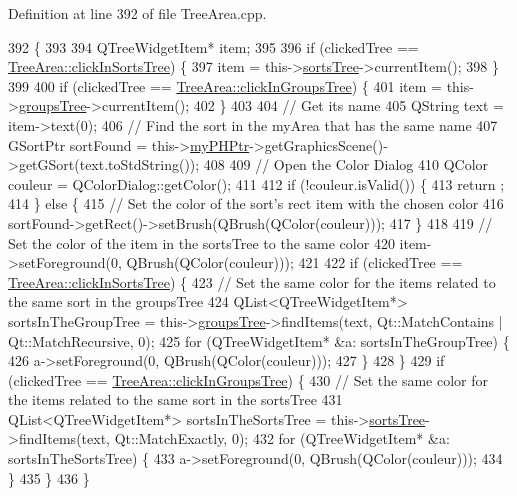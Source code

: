 Definition at line 392 of file Tree\+Area.\+cpp.


\begin{DoxyCode}
392                                               \{
393 
394     QTreeWidgetItem* item;
395 
396     \textcolor{keywordflow}{if} (clickedTree == \hyperlink{classTreeArea_a580e62f552dbda007c636bc69cc5e0a7}{TreeArea::clickInSortsTree}) \{
397         item = this->\hyperlink{classTreeArea_ad323879d9e2e64b18dae18fe757b1b0e}{sortsTree}->currentItem();
398     \}
399 
400     \textcolor{keywordflow}{if} (clickedTree == \hyperlink{classTreeArea_a6c8a68ece69178b1c902cf8ee8652756}{TreeArea::clickInGroupsTree}) \{
401         item = this->\hyperlink{classTreeArea_ab3cf8ca35655b0bace24a7c46170852f}{groupsTree}->currentItem();
402     \}
403 
404     \textcolor{comment}{// Get its name}
405     QString text = item->text(0);
406     \textcolor{comment}{// Find the sort in the myArea that has the same name}
407     GSortPtr sortFound = this->\hyperlink{classTreeArea_a290d659da16085f21c04f81fcd16891c}{myPHPtr}->getGraphicsScene()->getGSort(text.toStdString());
408 
409     \textcolor{comment}{// Open the Color Dialog}
410     QColor couleur = QColorDialog::getColor();
411 
412     \textcolor{keywordflow}{if} (!couleur.isValid()) \{
413         return ;
414     \} \textcolor{keywordflow}{else} \{
415         \textcolor{comment}{// Set the color of the sort's rect item with the chosen color}
416         sortFound->getRect()->setBrush(QBrush(QColor(couleur)));
417     \}
418 
419     \textcolor{comment}{// Set the color of the item in the sortsTree to the same color}
420     item->setForeground(0, QBrush(QColor(couleur)));
421 
422     \textcolor{keywordflow}{if} (clickedTree == \hyperlink{classTreeArea_a580e62f552dbda007c636bc69cc5e0a7}{TreeArea::clickInSortsTree}) \{
423         \textcolor{comment}{// Set the same color for the items related to the same sort in the groupsTree}
424         QList<QTreeWidgetItem*> sortsInTheGroupTree = this->\hyperlink{classTreeArea_ab3cf8ca35655b0bace24a7c46170852f}{groupsTree}->findItems(text, 
      Qt::MatchContains | Qt::MatchRecursive, 0);
425         \textcolor{keywordflow}{for} (QTreeWidgetItem* &a: sortsInTheGroupTree) \{
426             a->setForeground(0, QBrush(QColor(couleur)));
427         \}
428     \}
429     \textcolor{keywordflow}{if} (clickedTree == \hyperlink{classTreeArea_a6c8a68ece69178b1c902cf8ee8652756}{TreeArea::clickInGroupsTree}) \{
430         \textcolor{comment}{// Set the same color for the items related to the same sort in the sortsTree}
431         QList<QTreeWidgetItem*> sortsInTheSortsTree = this->\hyperlink{classTreeArea_ad323879d9e2e64b18dae18fe757b1b0e}{sortsTree}->findItems(text, 
      Qt::MatchExactly, 0);
432         \textcolor{keywordflow}{for} (QTreeWidgetItem* &a: sortsInTheSortsTree) \{
433             a->setForeground(0, QBrush(QColor(couleur)));
434         \}
435     \}
436 \}
\end{DoxyCode}
